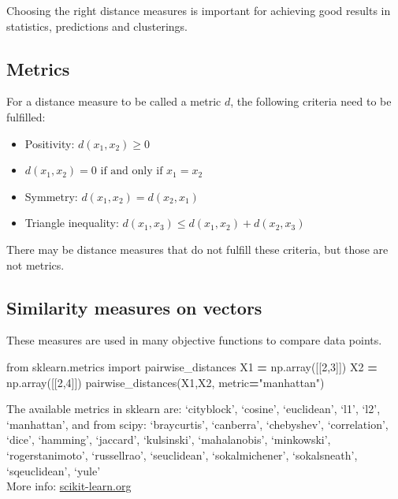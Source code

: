 \documentclass[
]{book}
\newenvironment{Shaded}{\begin{snugshade}}{\end{snugshade}}
\newcommand{\DecValTok}[1]{\textcolor[rgb]{0.00,0.00,0.81}{#1}}
\newcommand{\ImportTok}[1]{#1}
\newcommand{\NormalTok}[1]{#1}
\newcommand{\OperatorTok}[1]{\textcolor[rgb]{0.81,0.36,0.00}{\textbf{#1}}}
\newcommand{\StringTok}[1]{\textcolor[rgb]{0.31,0.60,0.02}{#1}}
\begin{document}
Choosing the right distance measures is important for achieving good
results in statistics, predictions and clusterings.

\hypertarget{metrics}{%
\subsection{Metrics}\label{metrics}}

For a distance measure to be called a metric \(d\), the following criteria
need to be fulfilled:

\begin{itemize}
\item
  Positivity: \(d(x_1,x_2)≥0\)
\item
  \(d(x_1,x_2)=0 \text{ if and only if } x_1 = x_2\)
\item
  Symmetry: \(d(x_1, x_2) = d(x_2, x_1)\)
\item
  Triangle inequality: \(d(x_1, x_3) ≤ d(x_1, x_2) + d(x_2, x_3)\)
\end{itemize}

There may be distance measures that do not fulfill these criteria, but
those are not metrics.

\hypertarget{similarity-measures-on-vectors}{%
\subsection{Similarity measures on vectors}\label{similarity-measures-on-vectors}}

These measures are used in many objective functions to compare data
points.

\begin{Shaded}
\begin{Highlighting}[]
\ImportTok{from}\NormalTok{ sklearn.metrics }\ImportTok{import}\NormalTok{ pairwise\_distances}
\NormalTok{X1 }\OperatorTok{=}\NormalTok{ np.array([[}\DecValTok{2}\NormalTok{,}\DecValTok{3}\NormalTok{]])}
\NormalTok{X2 }\OperatorTok{=}\NormalTok{ np.array([[}\DecValTok{2}\NormalTok{,}\DecValTok{4}\NormalTok{]])}
\NormalTok{pairwise\_distances(X1,X2, metric}\OperatorTok{=}\StringTok{"manhattan"}\NormalTok{)}
\end{Highlighting}
\end{Shaded}

The available metrics in sklearn are: `cityblock', `cosine',
`euclidean', `l1', `l2', `manhattan', and from scipy: `braycurtis',
`canberra', `chebyshev', `correlation', `dice', `hamming', `jaccard',
`kulsinski', `mahalanobis', `minkowski', `rogerstanimoto', `russellrao',
`seuclidean', `sokalmichener', `sokalsneath', `sqeuclidean', `yule'\\
More info:
\href{https://scikit-learn.org/stable/modules/generated/sklearn.metrics.pairwise_distances.html}{scikit-learn.org}
\end{document}
